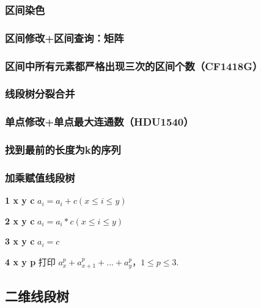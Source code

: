 \documentclass[twoside,a4paper]{article}
\begin{document}
\subsubsection{区间染色}


\subsubsection{区间修改+区间查询：矩阵}


\subsubsection{区间中所有元素都严格出现三次的区间个数（CF1418G）}


\subsubsection{线段树分裂合并}


\subsubsection{单点修改+单点最大连通数（HDU1540）}


\subsubsection{找到最前的长度为k的序列}


\subsubsection{加乘赋值线段树}
\textbf{1 x y c} $a_{i} = a_{i} + c (x \leq i \leq y)$\par
\textbf{2 x y c} $a_{i} = a_{i} * c (x \leq i \leq y)$\par
\textbf{3 x y c} $a_{i} = c $\par
\textbf{4 x y p} 打印 $a_{x}^{p} + a_{x+1}^{p} + ... +a_{y}^{p}$，$1 \leq p \leq 3$.


\subsection{二维线段树}

\end{document}
